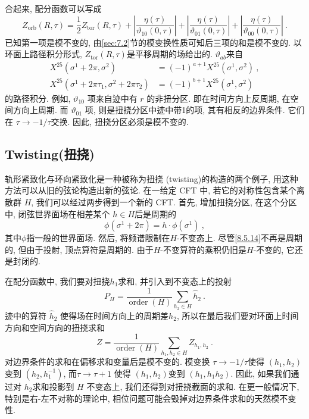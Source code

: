 合起来, 配分函数可以写成
\begin{equation}
	Z_{\text{orb}}(R, \tau)=\frac{1}{2} Z_{\text{tor}}(R, \tau) + \left|\frac{\eta(\tau)}{\vartheta_{10}(0, \tau)}\right|
	+ \left|\frac{\eta(\tau)}{\vartheta_{01}(0, \tau)}\right|+\left|\frac{\eta(\tau)}{\vartheta_{00}(0, \tau)}\right| \:. \label{8.5.12}
\end{equation}
已知第一项是模不变的, 由\ref{sec:7.2}节的模变换性质可知后三项的和是模不变的. 以环面上路径积分形式, $Z_{\text{tor}}(R, \tau)$是平移周期的场给出的. 
$\vartheta_{a b}$来自
\begin{subequations} \label{8.5.13}
\begin{align}
		X^{25}(\sigma^{1}+2 \pi, \sigma^{2}) &= (-1)^{a+1} X^{25}(\sigma^{1}, \sigma^{2}) \:, \label{8.5.13a}  \\
		X^{25}(\sigma^{1}+2 \pi \tau_{1}, \sigma^{2}+2 \pi \tau_{2}) &= (-1)^{b+1} X^{25}(\sigma^{1}, \sigma^{2})  \label{8.5.13b}
\end{align}
\end{subequations}
的路径积分. 例如, $\vartheta_{10}$ 项来自迹中有 $r$ 的非扭分区. 即在时间方向上反周期, 在空间方向上周期. 
而 $\vartheta_{01}$ 项, 则是扭挠分区中迹中带1的项, 其有相反的边界条件. 它们在 $\tau \rightarrow-1/\tau$交换. 
因此, 扭挠分区必须是模不变的.

\subsection*{Twisting(扭挠)}
轨形紧致化与环向紧致化是一种被称为扭挠 (twisting)的构造的两个例子, 用这种方法可以从旧的弦论构造出新的弦论. 在一给定 CFT 中, 若它的对称性包含某个离散群 $H$, 
我们可以经过两步得到一个新的 CFT. 
首先, 增加扭挠分区, 在这个分区中, 闭弦世界面场在相差某个 $h \in H$后是周期的
\begin{equation}
	\phi(\sigma^{1}+2 \pi )=h \cdot \phi(\sigma^{1}) \:, \label{8.5.14}
\end{equation}
其中$\phi$指一般的世界面场. 然后, 将频谱限制在$H$-不变态上. 尽管\eqref{8.5.14}不再是周期的, 但由于投射, 顶点算符是周期的. 
由于$H$-不变算符的乘积仍旧是$H$-不变的, 它还是封闭的. 

在配分函数中, 我们要对扭挠$h_{1}$求和, 并引入到不变态上的投射
\begin{equation}
	P_{H}=\frac{1}{\operatorname{order}(H)} \sum_{h_{2} \in H} \hat{h}_{2} \:. \label{8.5.15}
\end{equation}
迹中的算符 $\hat{h}_{2}$ 使得场在时间方向上的周期差$h_{2}$, 所以在最后我们要对环面上时间方向和空间方向的扭挠求和
\begin{equation}
	Z=\frac{1}{\operatorname{order}(H)} \sum_{h_{1}, h_{2} \in H} Z_{h_{1}, h_{2}} \:. \label{8.5.16}
\end{equation}
对边界条件的求和在偏移求和变量后是模不变的. 模变换 $\tau \rightarrow-1 / \tau$使得 $(h_{1}, h_{2})$ 变到 $(h_{2}, h_{1}^{-1})$, 
而$\tau \rightarrow \tau+1$ 使得 $(h_{1}, h_{2})$变到 $(h_{1}, h_{1} h_{2})$. 因此, 如果我们通过对 $h_{2}$求和投影到 $H$ 不变态上, 我们还得到对扭挠截面的求和. 在更一般情况下, 特别是右-左不对称的理论中, 相位问题可能会毁掉对边界条件求和的天然模不变性.

